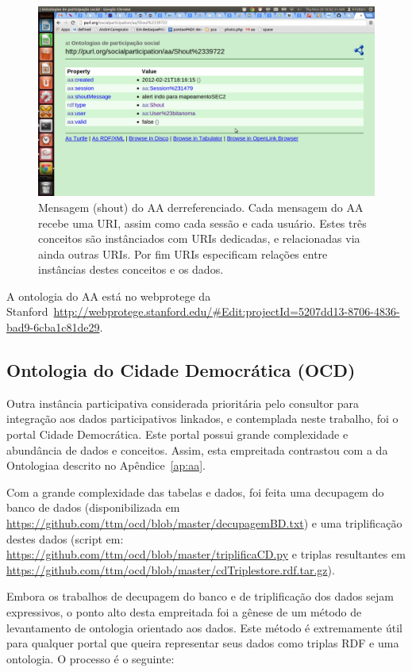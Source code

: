 \documentclass[12pt]{article}
\begin{document}
\begin{figure}[h!]
  \centering
    \includegraphics[width=\textwidth]{../figs/aaShoutPubby.png}
  \caption{Mensagem (shout) do AA derreferenciado. Cada mensagem do AA recebe uma URI, assim como cada sessão e cada usuário. Estes três conceitos são instânciados com URIs dedicadas, e relacionadas via ainda outras URIs. Por fim URIs especificam relações entre instâncias destes conceitos e os dados.}\label{fig:aashout}
\end{figure}

A ontologia do AA está no webprotege da Stanford~\url{http://webprotege.stanford.edu/#Edit:projectId=5207dd13-8706-4836-bad9-6cba1c81de29}.

\subsection{Ontologia do Cidade Democrática (OCD)}
Outra instância participativa considerada prioritária pelo consultor para integração aos dados participativos linkados, e contemplada neste trabalho, foi o portal Cidade Democrática. Este portal possui grande complexidade e abundância de dados e conceitos. Assim, esta empreitada contrastou com a da Ontologiaa descrito no Apêndice~\ref{ap:aa}.

Com a grande complexidade das tabelas e dados, foi feita uma decupagem do banco de dados (disponibilizada em \url{https://github.com/ttm/ocd/blob/master/decupagemBD.txt}) e uma triplificação destes dados (script em: \url{https://github.com/ttm/ocd/blob/master/triplificaCD.py} e triplas resultantes em \url{https://github.com/ttm/ocd/blob/master/cdTriplestore.rdf.tar.gz}).

Embora os trabalhos de decupagem do banco e de triplificação dos dados sejam expressivos, o ponto alto desta empreitada foi a gênese de um método de levantamento de ontologia orientado aos dados. Este método é extremamente útil para qualquer portal que queira representar seus dados como triplas RDF e uma ontologia. O processo é o seguinte:
\end{document}
